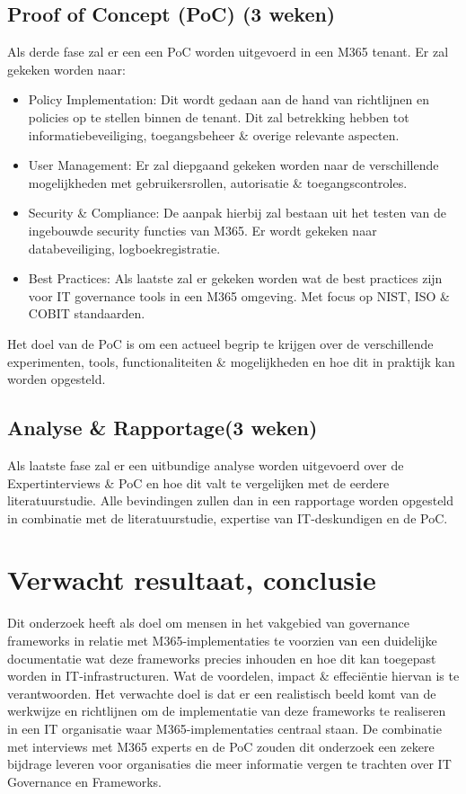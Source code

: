 \subsection{Proof of Concept (PoC) (3 weken)}
Als derde fase zal er een een PoC worden uitgevoerd in een M365 tenant. Er zal gekeken worden naar:
\begin{itemize}
  \item Policy Implementation:
  Dit wordt gedaan aan de hand van richtlijnen en policies op te stellen binnen de tenant. Dit zal betrekking hebben tot informatiebeveiliging, toegangsbeheer \& overige relevante aspecten.
  \item User Management:
  Er zal diepgaand gekeken worden naar de verschillende mogelijkheden met gebruikersrollen, autorisatie \& toegangscontroles.
  \item Security \& Compliance:
  De aanpak hierbij zal bestaan uit het testen van de ingebouwde security functies van M365. Er wordt gekeken naar databeveiliging, logboekregistratie.
  \item Best Practices:
  Als laatste zal er gekeken worden wat de best practices zijn voor IT governance tools in een M365 omgeving. Met focus op NIST, ISO \& COBIT standaarden. 
\end{itemize}
Het doel van de PoC is om een actueel begrip te krijgen over de verschillende experimenten,  tools, functionaliteiten \& mogelijkheden  en hoe dit in praktijk kan worden opgesteld. 

\subsection{ Analyse \& Rapportage(3 weken)}
Als laatste fase zal er een uitbundige analyse worden uitgevoerd over de Expertinterviews \& PoC en hoe dit valt te vergelijken met de eerdere literatuurstudie. Alle bevindingen zullen dan in een rapportage worden opgesteld in combinatie met de literatuurstudie, expertise van IT-deskundigen en de PoC.


\section{Verwacht resultaat, conclusie}%
\label{sec:verwachte_resultaten}

Dit onderzoek heeft als doel om mensen in het vakgebied van governance frameworks in relatie met M365-implementaties te voorzien van een duidelijke documentatie wat deze frameworks precies inhouden en hoe dit kan toegepast worden in IT-infrastructuren. Wat de voordelen, impact \& effeciëntie hiervan is te verantwoorden. Het verwachte doel is dat er een realistisch beeld komt van de werkwijze en richtlijnen om de implementatie van deze frameworks te realiseren in een IT organisatie waar M365-implementaties centraal staan.
De combinatie met interviews met M365 experts en de PoC zouden dit onderzoek een zekere bijdrage leveren voor organisaties die meer informatie vergen te trachten over IT Governance en Frameworks.



